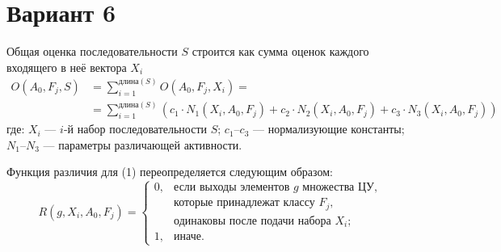 \documentclass{article}
\begin{document}
\section*{Вариант 6}

Общая оценка последовательности $S$ строится как сумма оценок каждого входящего в неё вектора $X_{i}$
\begin{equation}
\begin{aligned}
O(A_{0},F_{j},S) &= \sum_{i=1}^{\text{длина}(S)}O(A_{0},F_{j},X_{i}) = \\
&= \sum_{i=1}^{\text{длина}(S)}\left(c_{1}\cdot N_{1}(X_{i},A_{0},F_{j})+c_{2}\cdot N_{2}(X_{i},A_{0},F_{j})+c_{3}\cdot N_{3}(X_{i},A_{0},F_{j})\right)
\end{aligned}
\end{equation}
где: $X_{i}$ --- $i$-й набор последовательности $S$; $c_{1}$--$c_{3}$ --- нормализующие константы; $N_{1}$--$N_{3}$ --- параметры различающей активности.

Функция различия для (1) переопределяется следующим образом:
\begin{equation}
R(g, X_{i}, A_{0}, F_{j}) =
\begin{cases}
0, & \text{если выходы элементов } g \text{ множества ЦУ,} \\
   & \text{которые принадлежат классу } F_{j}, \\
   & \text{одинаковы после подачи набора } X_{i}; \\
1, & \text{иначе.}
\end{cases}
\end{equation}
\end{document}
